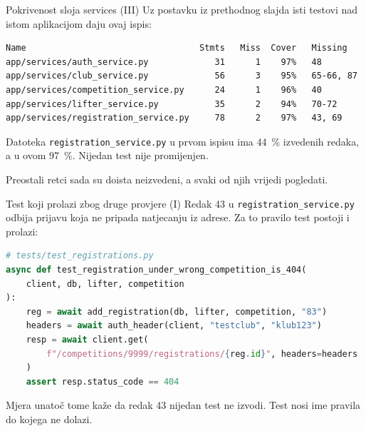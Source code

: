 \begin{frame}[fragile]{Pokrivenost sloja services (III)}
Uz postavku iz prethodnog slajda isti testovi nad istom aplikacijom daju ovaj ispis:

\begin{lstlisting}[keepspaces=true]
Name                                  Stmts   Miss  Cover   Missing
app/services/auth_service.py             31      1    97%   48
app/services/club_service.py             56      3    95%   65-66, 87
app/services/competition_service.py      24      1    96%   40
app/services/lifter_service.py           35      2    94%   70-72
app/services/registration_service.py     78      2    97%   43, 69
\end{lstlisting}

\vspace{0.4em}
Datoteka \texttt{registration\_service.py} u prvom ispisu ima 44~\% izvedenih redaka, a u ovom 97~\%. Nijedan test nije promijenjen.

\vspace{0.4em}
Preostali retci sada su doista neizvedeni, a svaki od njih vrijedi pogledati.
\end{frame}

\begin{frame}[fragile]{Test koji prolazi zbog druge provjere (I)}
Redak 43 u \texttt{registration\_service.py} odbija prijavu koja ne pripada natjecanju iz adrese. Za to pravilo test postoji i prolazi:

\begin{lstlisting}[language=python]
# tests/test_registrations.py
async def test_registration_under_wrong_competition_is_404(
    client, db, lifter, competition
):
    reg = await add_registration(db, lifter, competition, "83")
    headers = await auth_header(client, "testclub", "klub123")
    resp = await client.get(
        f"/competitions/9999/registrations/{reg.id}", headers=headers
    )
    assert resp.status_code == 404
\end{lstlisting}

\vspace{0.3em}
Mjera unatoč tome kaže da redak 43 nijedan test ne izvodi. Test nosi ime pravila do kojega ne dolazi.
\end{frame}

